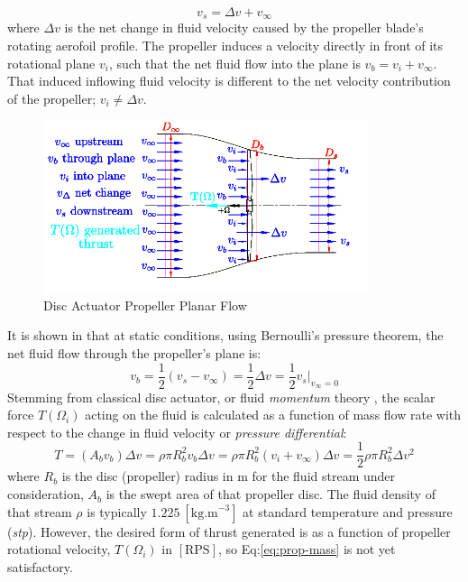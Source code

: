 \begin{equation}
v_s = \Delta v + v_\infty
\end{equation}
where $\Delta v$ is the net change in fluid velocity caused by the propeller blade's rotating aerofoil profile. The propeller induces a velocity directly in front of its rotational plane $v_i$, such that the net fluid flow into the plane is $v_b=v_i+v_\infty$. That induced inflowing fluid velocity is different to the net velocity contribution of the propeller; $v_i\not=\Delta v$.
\par
\begin{figure}[htbp]
\centering
\includegraphics[width=0.85\textwidth]{figs/bem-flow}
\vspace{-12pt}
\caption{Disc Actuator Propeller Planar Flow}
\label{fig:bem-flow}
\vspace{-15pt}
\end{figure}
It is shown in \cite{bladesforquadrotors} that at static conditions, using Bernoulli's pressure theorem, the net fluid flow through the propeller's plane is:
\begin{equation}\label{eq:bernoulli}
v_b = \frac{1}{2} ( v_s - v_{\infty} ) = \frac{1}{2} \Delta v = \frac{1}{2} v_s \big|_{v_\infty=0}
\end{equation}
Stemming from classical disc actuator, or fluid \emph{momentum} theory \cite{fluidmomentum,propellers}, the scalar force $T(\Omega_i)$ acting on the fluid is calculated as a function of mass flow rate with respect to the change in fluid velocity or \emph{pressure differential}:
\begin{equation}\label{eq:prop-mass}
T=(A_b v_b)\Delta v = \rho \pi R_b^2v_b \Delta v = \rho \pi R_b^2(v_i+v_\infty)\Delta v = \frac{1}{2} \rho \pi R_b^2 \Delta v^2
\end{equation}
where $R_b$ is the disc (propeller) radius in $\text{m}$ for the fluid stream under consideration, $A_b$ is the swept area of that propeller disc. The fluid density of that stream $\rho$ is typically $1.225~[\text{kg.m}^{-3}]$ at standard temperature and pressure (\emph{stp}). However, the desired form of thrust generated is as a function of propeller rotational velocity, $T(\Omega_i)$ in $[\text{RPS}]$, so Eq:\ref{eq:prop-mass} is not yet satisfactory. 
